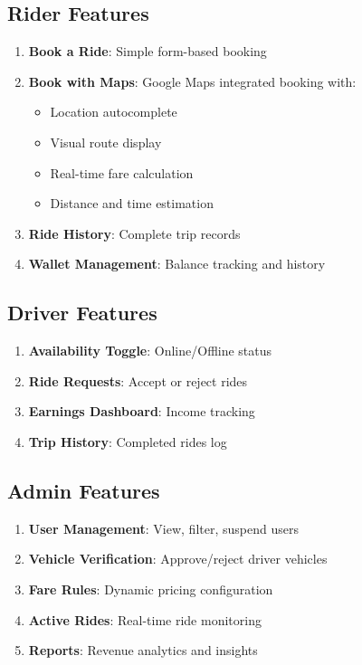 \documentclass[12pt,a4paper]{report}
\begin{document}
\subsection{Rider Features}
\begin{enumerate}
    \item \textbf{Book a Ride}: Simple form-based booking
    \item \textbf{Book with Maps}: Google Maps integrated booking with:
    \begin{itemize}
        \item Location autocomplete
        \item Visual route display
        \item Real-time fare calculation
        \item Distance and time estimation
    \end{itemize}
    \item \textbf{Ride History}: Complete trip records
    \item \textbf{Wallet Management}: Balance tracking and history
\end{enumerate}

\subsection{Driver Features}
\begin{enumerate}
    \item \textbf{Availability Toggle}: Online/Offline status
    \item \textbf{Ride Requests}: Accept or reject rides
    \item \textbf{Earnings Dashboard}: Income tracking
    \item \textbf{Trip History}: Completed rides log
\end{enumerate}

\subsection{Admin Features}
\begin{enumerate}
    \item \textbf{User Management}: View, filter, suspend users
    \item \textbf{Vehicle Verification}: Approve/reject driver vehicles
    \item \textbf{Fare Rules}: Dynamic pricing configuration
    \item \textbf{Active Rides}: Real-time ride monitoring
    \item \textbf{Reports}: Revenue analytics and insights
\end{enumerate}
\end{document}
